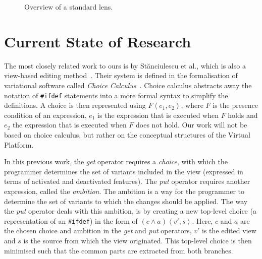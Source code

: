 \begin{figure}
  \centering
  \caption{Overview of a standard lens.}
  \label{fig:lens:overview}
\end{figure}

\section*{Current State of Research}
The most closely related work to ours is by St{\u{a}}nciulescu et al., which is
also a view-based editing method~\cite{stuanciulescu2016}. Their system is
defined in the formalisation of variational software called \emph{Choice Calculus}~\cite{walkingshaw2014}.
Choice calculus abstracts away the notation of \texttt{\#ifdef} statements into
a more formal syntax to simplify the definitions. A choice is then represented
using \(F \left<e_1, e_2\right>\), where $F$ is the presence condition of an
expression, $e_1$ is the expression that is executed when $F$ holds and $e_2$
the expression that is executed when $F$ does not hold. Our work will not be 
based on choice calculus, but rather on the conceptual structures of the Virtual
Platform.

In this previous work, the \emph{get} operator requires a \emph{choice}, with
which the programmer determines the set of variants included in the view (expressed
in terms of activated and deactivated features).
The \emph{put} operator requires another expression, called the \emph{ambition}.
The ambition is a way for the programmer to determine the set of variants to
which the changes should be applied. The way the \emph{put} operator deals with
this ambition, is by creating a new top-level choice (a representation of an
\texttt{\#ifdef}) in the form of \( \left(c \land a\right)\left<v', s\right> \).
Here, $c$ and $a$ are the chosen choice and ambition in the \emph{get} and
\emph{put} operators, $v'$ is the edited view and $s$ is the source from which
the view originated. This top-level choice is then minimised such that the
common parts are extracted from both branches.

